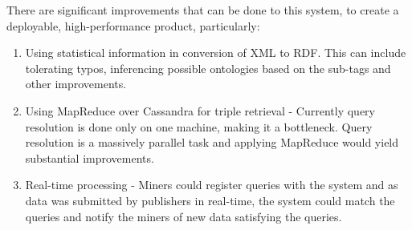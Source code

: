 \documentclass[conference]{IEEEtran}
\begin{document}
There are significant improvements that can be done to this system, to create a deployable, high-performance product, particularly:

\begin{enumerate}
    \item Using statistical information in conversion of XML to RDF. This can include tolerating typos, inferencing possible ontologies based on the sub-tags and other improvements.
    \item Using MapReduce over Cassandra for triple retrieval - Currently query resolution is done only on one machine, making it a bottleneck. Query resolution is a massively parallel task and applying MapReduce\cite{Dean04mapreduce:simplified}\cite{hus09hadoop} would yield substantial improvements.
    \item Real-time processing - Miners could register queries with the system and as data was submitted by publishers in real-time, the system could match the queries and notify the miners of new data satisfying the queries\cite{Aba03aurora}.
\end{enumerate}
\end{document}
